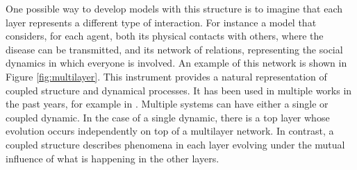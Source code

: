 One possible way to develop models with this structure is to imagine that each layer represents a different type of interaction. For instance a model that considers, for each agent, both its physical contacts with others, where the disease can be transmitted, and its network of relations, representing the social dynamics in which everyone is involved. An example of this network is shown in Figure \ref{fig:multilayer}. This instrument provides a natural representation of coupled structure and dynamical processes. It has been used in multiple works in the past years, for example in \cite{Wang_2019}. 
Multiple systems can have either a single or coupled dynamic. In the case of a single dynamic, there is a top layer whose evolution occurs independently on top of a multilayer network. In contrast, a coupled structure describes phenomena in each layer evolving under the mutual influence of what is happening in the other layers.


